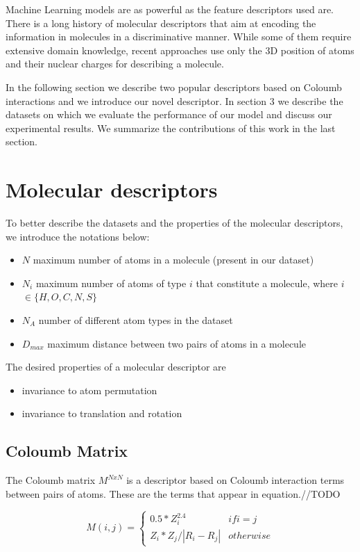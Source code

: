 \documentclass{article}
\begin{document}
Machine Learning models are as powerful as the feature descriptors used are. There is a long history of molecular descriptors \cite{todeschini2000handbook} that aim at encoding the information in molecules in a discriminative manner. While some of them require extensive domain knowledge, recent approaches \cite{initialcoloumb} use only the 3D position of atoms and their nuclear charges for describing a molecule.

In the following section we describe two popular descriptors based on Coloumb interactions and we introduce our novel descriptor. In section 3 we describe the datasets on which we evaluate the performance of our model and discuss our experimental results. We summarize the contributions of this work in the last section.

\section{Molecular descriptors}

To better describe the datasets and the properties of the molecular descriptors, we introduce the notations below:
\begin{itemize}
\item $N$ maximum number of atoms in a molecule (present in our dataset)
\item $N_i$ maximum number of atoms of type $i$ that constitute a molecule, where $i$ $\in \{H, O, C, N, S\}$
\item $N_A$ number of different atom types in the dataset
\item $D_{max}$ maximum distance between two pairs of atoms in a molecule
\end{itemize}
The desired properties of a molecular descriptor are
\begin{itemize}
 \item invariance to atom permutation
 \item invariance to translation and rotation
\end{itemize}

\subsection{Coloumb Matrix}
The Coloumb matrix\citep{initialcoloumb} $M^{NxN}$ is a descriptor based on  Coloumb interaction terms between pairs of atoms. These are the terms that appear in equation.//TODO

\[M(i,j) = \left\{
  \begin{array}{lr}
    0.5*Z_i^{2.4} & if i = j\\
    Z_i * Z_j / |R_i - R_j| & otherwise
  \end{array}
\right.
\]
\end{document}
